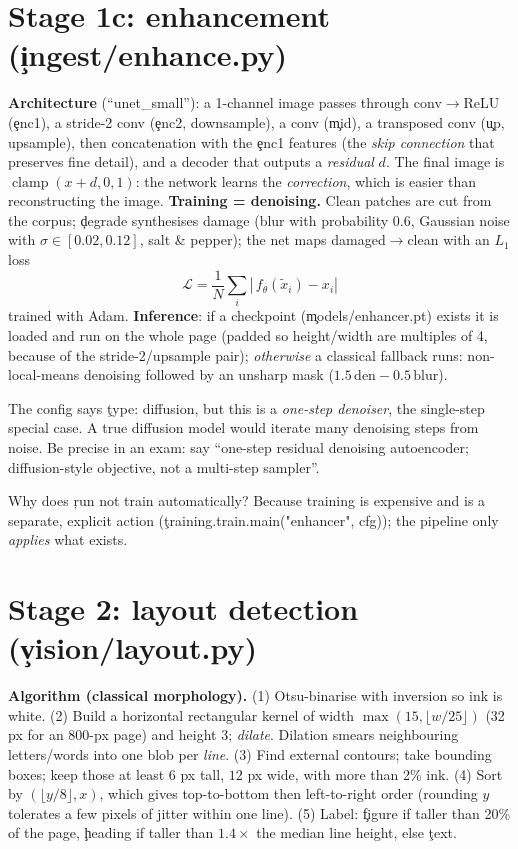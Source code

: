 \section{Stage 1c: enhancement (\c{ingest/enhance.py})}
\textbf{Architecture} (``unet\_small''): a 1-channel image passes through conv$\to$ReLU (\c{enc1}), a stride-2 conv (\c{enc2}, downsample), a conv (\c{mid}), a transposed conv (\c{up}, upsample), then concatenation with the \c{enc1} features (the \emph{skip connection} that preserves fine detail), and a decoder that outputs a \emph{residual} $d$. The final image is $\operatorname{clamp}(x + d,0,1)$: the network learns the \emph{correction}, which is easier than reconstructing the image.
\textbf{Training = denoising.} Clean patches are cut from the corpus; \c{degrade} synthesises damage (blur with probability 0.6, Gaussian noise with $\sigma\in[0.02,0.12]$, salt \& pepper); the net maps damaged$\to$clean with an $L_1$ loss
\[ \mathcal{L}=\frac1N\sum_i \left|\,f_\theta(\tilde x_i)-x_i\right| \]
trained with Adam.
\textbf{Inference}: if a checkpoint (\c{models/enhancer.pt}) exists it is loaded and run on the whole page (padded so height/width are multiples of 4, because of the stride-2/upsample pair); \emph{otherwise} a classical fallback runs: non-local-means denoising followed by an unsharp mask ($1.5\,\text{den}-0.5\,\text{blur}$).
\begin{gotcha}
The config says \c{type: diffusion}, but this is a \emph{one-step denoiser}, the single-step special case. A true diffusion model would iterate many denoising steps from noise. Be precise in an exam: say ``one-step residual denoising autoencoder; diffusion-style objective, not a multi-step sampler''.
\end{gotcha}
\begin{tryit}
Why does \c{run} not train automatically? Because training is expensive and is a separate, explicit action (\c{training.train.main("enhancer", cfg)}); the pipeline only \emph{applies} what exists.
\end{tryit}

\section{Stage 2: layout detection (\c{vision/layout.py})}
\textbf{Algorithm (classical morphology).} (1) Otsu-binarise with inversion so ink is white. (2) Build a horizontal rectangular kernel of width $\max(15,\lfloor w/25\rfloor)$ (32 px for an 800-px page) and height 3; \emph{dilate}. Dilation smears neighbouring letters/words into one blob per \emph{line}. (3) Find external contours; take bounding boxes; keep those at least $6$ px tall, $12$ px wide, with more than 2\% ink. (4) Sort by $(\lfloor y/8\rfloor, x)$, which gives top-to-bottom then left-to-right order (rounding $y$ tolerates a few pixels of jitter within one line). (5) Label: \c{figure} if taller than 20\% of the page, \c{heading} if taller than $1.4\times$ the median line height, else \c{text}.

